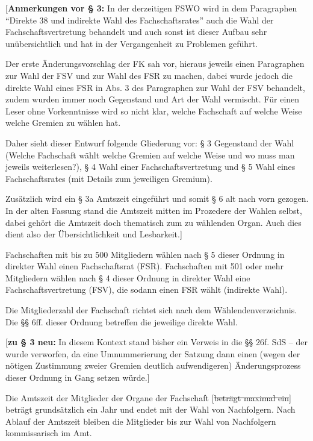 \documentclass[%
draft,%
multilinesections%
]{fswo}
\newcommand\oldT[1] {{\color{Gray}[\st{#1}]}}
\newcommand\bemFr[1]{{\color{Red}[#1]}}
\newcommand\oldT[1]{}%
\newcommand\bemFr[1]{}%
\begin{document}
\bemFr{\textbf{Anmerkungen vor § 3:} In der derzeitigen FSWO wird in dem Paragraphen \enquote{Direkte 38 und indirekte Wahl des Fachschaftsrates} auch die Wahl der Fachschaftsvertretung behandelt und auch sonst ist dieser Aufbau sehr unübersichtlich und hat in der Vergangenheit zu Problemen geführt.

Der erste Änderungsvorschlag der FK sah vor, hieraus jeweils einen Paragraphen zur Wahl der FSV und zur Wahl des FSR zu machen, dabei wurde jedoch die direkte Wahl eines FSR in Abs. 3 des Paragraphen zur Wahl der FSV behandelt, zudem wurden immer noch Gegenstand und Art der Wahl vermischt.
Für einen Leser ohne Vorkenntnisse wird so nicht klar, welche Fachschaft auf welche Weise welche Gremien zu wählen hat.

Daher sieht dieser Entwurf folgende Gliederung vor:
§ 3 Gegenstand der Wahl (Welche Fachschaft wählt welche Gremien auf welche Weise und wo muss man jeweils weiterlesen?), § 4 Wahl einer Fachschaftsvertretung und § 5 Wahl eines Fachschaftsrates (mit Details zum jeweiligen Gremium).

Zusätzlich wird ein § 3a Amtszeit eingeführt und somit § 6 alt nach vorn gezogen. In der alten Fassung stand die Amtszeit mitten im Prozedere der Wahlen selbst, dabei gehört die Amtszeit doch thematisch zum zu wählenden Organ. Auch dies dient also der Übersichtlichkeit und Lesbarkeit.}

\begin{contract}
Fachschaften mit bis zu 500 Mitgliedern wählen nach § 5 dieser Ordnung in direkter Wahl einen Fachschaftsrat (FSR).
Fachschaften mit 501 oder mehr Mitgliedern wählen nach § 4 dieser Ordnung in direkter Wahl eine Fachschaftsvertretung (FSV), die sodann einen FSR wählt (indirekte Wahl).

Die Mitgliederzahl der Fachschaft richtet sich nach dem Wählendenverzeichnis.
Die §§ 6ff. dieser Ordnung betreffen die jeweilige direkte Wahl.
\end{contract}

\bemFr{\textbf{zu § 3 neu:} In diesem Kontext stand bisher ein Verweis in die §§ 26f. SdS – der wurde verworfen, da eine Umnummerierung der Satzung dann einen (wegen der nötigen Zustimmung zweier Gremien deutlich aufwendigeren) Änderungsprozess dieser Ordnung in Gang setzen würde.}

\begin{contract}
Die Amtszeit der Mitglieder der Organe der Fachschaft \oldT{beträgt maximal ein} beträgt grundsätzlich ein Jahr und endet mit der Wahl von Nachfolgern.
Nach Ablauf der Amtszeit bleiben die Mitglieder bis zur Wahl von Nachfolgern kommissarisch im Amt.
\end{contract}
\end{document}
